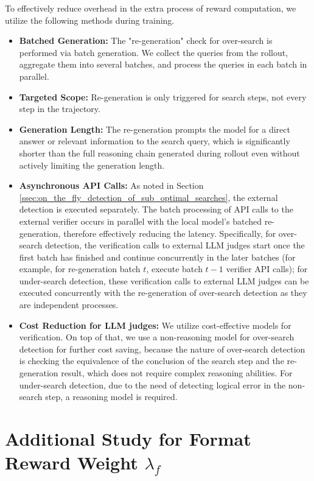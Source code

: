 \documentclass{article}
\begin{document}
To effectively reduce overhead in the extra process of reward computation, we utilize the following methods during training.
\begin{itemize}
 \item \textbf{Batched Generation:} The "re-generation" check for over-search is performed via batch generation. We collect the queries from the rollout, aggregate them into several batches, and process the queries in each batch in parallel.
 \item \textbf{Targeted Scope:} Re-generation is only triggered for search steps, not every step in the trajectory.
 \item \textbf{Generation Length:} The re-generation prompts the model for a direct answer or relevant information to the search query, which is significantly shorter than the full reasoning chain generated during rollout even without actively limiting the generation length.
 \item \textbf{Asynchronous API Calls:} As noted in Section \ref{ssec:on_the_fly_detection_of_sub_optimal_searches}, the external detection is executed separately. The batch processing of API calls to the external verifier occurs in parallel with the local model's batched re-generation, therefore effectively reducing the latency. Specifically, for over-search detection, the verification calls to external LLM judges start once the first batch has finished and continue concurrently in the later batches (for example, for re-generation batch $t$, execute batch $t - 1$ verifier API calls); for under-search detection, these verification calls to external LLM judges can be executed concurrently with the re-generation of over-search detection as they are independent processes.
 \item \textbf{Cost Reduction for LLM judges:} We utilize cost-effective models for verification. On top of that, we use a non-reasoning model for over-search detection for further cost saving, because the nature of over-search detection is checking the equivalence of the conclusion of the search step and the re-generation result, which does not require complex reasoning abilities. For under-search detection, due to the need of detecting logical error in the non-search step, a reasoning model is required.
\end{itemize}

\section{Additional Study for Format Reward Weight \texorpdfstring{$\lambda_f$}{lambda f}}
\end{document}
